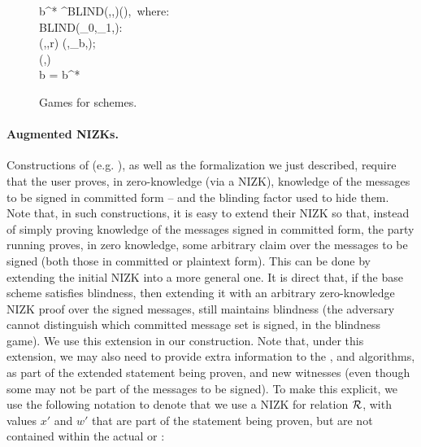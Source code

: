 \begin{figure}[ht!]
{\begin{minipage}[t]{0.43\textwidth}
{        %
        b^* \gets \adv^{BLIND(\cdot,\cdot,\cdot)}(\vk),~\textrm{where:} \\
        \pcind BLIND(\osmsg_0,\osmsg_1,\smsg): \\
        \pcind \pcind (\com,\pi,r) \gets \Blind(\vk,\osmsg_b,\smsg); \\
        \pcind \pcind \pcreturn (\com,\pi) \\
        \pcreturn b = b^*
      }
    \end{minipage}
  }
  \label{fig:sbcm-games}
  \caption{Games for \SBCM schemes.
  }
\end{figure}

\paragraph{Augmented NIZKs.} %
Constructions of \SBCM (e.g. \cite{asm06}), as well as the formalization we just
described, require that the user proves, in zero-knowledge (via a NIZK),
knowledge of the messages to be signed in committed
form -- and the blinding factor used to hide them. Note that, in such
constructions, it is easy to extend their NIZK so that, instead of simply
proving knowledge of the messages signed in committed form, the party running
\SBCMBlind proves, in zero knowledge, some arbitrary claim over the messages to
be signed (both those in committed or plaintext form). This can be done by
extending the initial NIZK into a more general one. 
%
It is direct that, if the base \SBCM scheme satisfies blindness, then extending
it with an arbitrary zero-knowledge NIZK proof over the signed messages, still
maintains blindness (the adversary cannot distinguish which committed message
set is signed, in the blindness game).
%
We use this extension in our \CUASGen construction. Note that, under this
extension, we may also need to provide extra information to the \SBCMBlind,
\SBCMSign and \SBCMUnblind algorithms, as part of the extended statement being
proven, and new witnesses (even though some may not be part of the messages to
be signed). To make this explicit, we use the following notation to denote
that we use a NIZK for relation $\mathcal{R}$, with values $x'$ and $w'$ that are
part of the statement being proven, but are not contained within the actual
\smsg or \osmsg:

